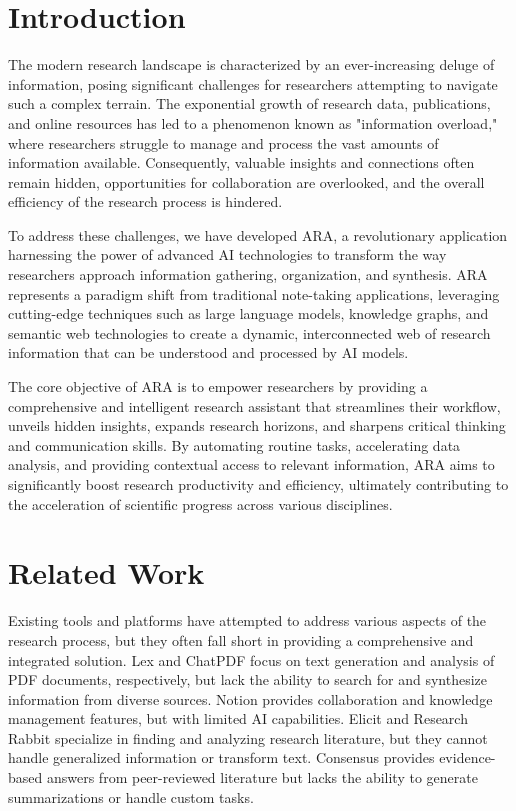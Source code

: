 \documentclass[a4paper,conference]{IEEEtran}
\begin{document}
\section{Introduction}
The modern research landscape is characterized by an ever-increasing deluge of information, posing significant challenges for researchers attempting to navigate such a complex terrain. The exponential growth of research data, publications, and online resources has led to a phenomenon known as "information overload," where researchers struggle to manage and process the vast amounts of information available. Consequently, valuable insights and connections often remain hidden, opportunities for collaboration are overlooked, and the overall efficiency of the research process is hindered.

To address these challenges, we have developed ARA, a revolutionary application harnessing the power of advanced AI technologies to transform the way researchers approach information gathering, organization, and synthesis. ARA represents a paradigm shift from traditional note-taking applications, leveraging cutting-edge techniques such as large language models, knowledge graphs, and semantic web technologies to create a dynamic, interconnected web of research information that can be understood and processed by AI models.

The core objective of ARA is to empower researchers by providing a comprehensive and intelligent research assistant that streamlines their workflow, unveils hidden insights, expands research horizons, and sharpens critical thinking and communication skills. By automating routine tasks, accelerating data analysis, and providing contextual access to relevant information, ARA aims to significantly boost research productivity and efficiency, ultimately contributing to the acceleration of scientific progress across various disciplines.

\section{Related Work}
Existing tools and platforms have attempted to address various aspects of the research process, but they often fall short in providing a comprehensive and integrated solution. Lex \cite{5} and ChatPDF \cite{23} focus on text generation and analysis of PDF documents, respectively, but lack the ability to search for and synthesize information from diverse sources. Notion \cite{1} provides collaboration and knowledge management features, but with limited AI capabilities. Elicit \cite{26} and Research Rabbit \cite{37} specialize in finding and analyzing research literature, but they cannot handle generalized information or transform text. Consensus \cite{24} provides evidence-based answers from peer-reviewed literature but lacks the ability to generate summarizations or handle custom tasks.
\end{document}
